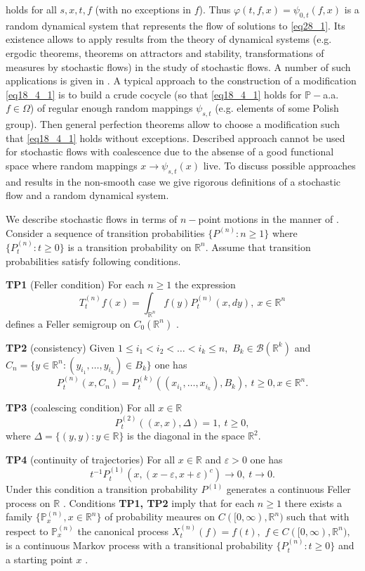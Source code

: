 \documentclass[a4paper,12pt]{article}
\newcommand{\1}{1\!\!\,{\rm I}}
\theoremstyle{plain}
\begin{document}
holds for all $s,x,t,f$ (with no exceptions in $f$). Thus $\varphi(t,f,x)=\psi_{0,t}(f,x)$ is a random dynamical system that represents the flow of solutions to \eqref{eq28_1}. Its existence allows to apply results from the theory of dynamical systems (e.g. ergodic theorems, theorems on attractors and stability, transformations of measures by stochastic flows) in the study of stochastic flows. A number of such applications is given in \cite{Arnold, Kunita}. A typical approach to the construction of a modification \eqref{eq18_4_1} is to build a crude cocycle (so that \eqref{eq18_4_1} holds for $\mathbb{P}-$a.a. $f\in \Omega$) of regular enough random mappings $\psi_{s,t}$ (e.g. elements of some Polish group).  Then general perfection theorems  \cite{Arnold, Arnold_Scheutzow} allow to choose a modification such that \eqref{eq18_4_1} holds without exceptions. Described approach cannot be used for stochastic flows with coalescence due to the absense of a good functional space where random mappings  $x\to\psi_{s,t}(x)$ live. To discuss possible approaches and results in the non-smooth case we give rigorous definitions of a stochastic flow and a random dynamical system.

We describe stochastic flows in terms of $n-$point motions in the manner of \cite{LJR}. Consider a sequence of transition probabilities $\{P^{(n)}:n\geq 1\}$ where $\{P^{(n)}_t:t\geq 0\}$ is a transition probability on $\mathbb{R}^n.$ Assume that transition probabilities satisfy following conditions.

{\bf TP1} (Feller condition) For each $n\geq 1$ the expression 
$$
T^{(n)}_t f(x)=\int_{\mathbb{R}^n} f(y)P^{(n)}_t(x,dy), \ x\in \mathbb{R}^n
$$
defines a Feller semigroup on $C_0(\mathbb{R}^n)$ \cite[Ch.4, \S 2]{EK}.

{\bf TP2} (consistency) Given $1\leq i_1< i_2<\ldots <i_k\leq n,$ $B_k\in \mathcal{B}(\mathbb{R}^k)$ and $C_n=\{y\in \mathbb{R}^n: (y_{i_1},\ldots,y_{i_k})\in B_k\}$  one has
$$
P^{(n)}_t(x,C_n)=P^{(k)}_t((x_{i_1},\ldots,x_{i_k}),B_k), \ t\geq 0, x\in \mathbb{R}^n.
$$

{\bf TP3} (coalescing condition) For all $x\in \mathbb{R}$ 
\begin{equation}
\label{eq24_2}
P^{(2)}_t((x,x),\Delta)=1, \ t\geq 0,
\end{equation}
where $\Delta=\{(y,y):y\in \mathbb{R}\}$ is the diagonal in the space $\mathbb{R}^2.$


{\bf TP4} (continuity of trajectories) For all $x\in\mathbb{R}$ and $\varepsilon>0$ one has
$$
t^{-1}P^{(1)}_t(x,(x-\varepsilon,x+\varepsilon)^c)\to 0, \ t\to 0.
$$
\noindent
Under this condition a transition probability $P^{(1)}$ generates a continuous Feller process on $\mathbb{R}$ \cite[Ch. 4, Prop. 2.9]{EK}.  Conditions  {\bf TP1, TP2} imply that for each $n\geq 1$ there exists a family $\{\mathbb{P}^{(n)}_x,x\in\mathbb{R}^n\}$ of probability meaures on  $C([0,\infty),\mathbb{R}^n)$ such that with respect to $\mathbb{P}^{(n)}_x$ the canonical process $X^{(n)}_t(f)=f(t),$ $f\in C([0,\infty),\mathbb{R}^n),$ is a continuous Markov process with a transitional probability $\{P^{(n)}_t:t\geq 0\}$ and a starting point $x$  \cite[Ch. 4, Th. 1.1]{EK}.
\end{document}
